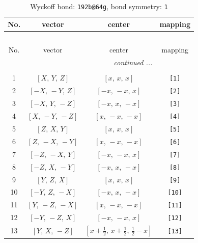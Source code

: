 \documentclass[fleqn,8pt]{jsarticle}
\begin{document}
\begin{longtable}{cccc}
\caption{Wyckoff bond: {\tt 192b@64g}, bond symmetry: {\tt 1}}
 \\
 \hline \hline
No. & vector & center & mapping \\ \hline \endfirsthead

\multicolumn{3}{l}{\tablename\ \thetable{}} \\
 \hline \hline
No. & vector & center & mapping \\ \hline \endhead

 \hline \hline
\multicolumn{3}{r}{\footnotesize\it continued ...} \\ \endfoot

 \hline \hline
\multicolumn{3}{r}{} \\ \endlastfoot

1 & $\left[ X,\, Y,\, Z \right]$ & $\left[ x,\, x,\, x \right]$ & {\tt [1]} \\ \hline
2 & $\left[ - X,\, - Y,\, Z \right]$ & $\left[ - x,\, - x,\, x \right]$ & {\tt [2]} \\ \hline
3 & $\left[ - X,\, Y,\, - Z \right]$ & $\left[ - x,\, x,\, - x \right]$ & {\tt [3]} \\ \hline
4 & $\left[ X,\, - Y,\, - Z \right]$ & $\left[ x,\, - x,\, - x \right]$ & {\tt [4]} \\ \hline
5 & $\left[ Z,\, X,\, Y \right]$ & $\left[ x,\, x,\, x \right]$ & {\tt [5]} \\ \hline
6 & $\left[ Z,\, - X,\, - Y \right]$ & $\left[ x,\, - x,\, - x \right]$ & {\tt [6]} \\ \hline
7 & $\left[ - Z,\, - X,\, Y \right]$ & $\left[ - x,\, - x,\, x \right]$ & {\tt [7]} \\ \hline
8 & $\left[ - Z,\, X,\, - Y \right]$ & $\left[ - x,\, x,\, - x \right]$ & {\tt [8]} \\ \hline
9 & $\left[ Y,\, Z,\, X \right]$ & $\left[ x,\, x,\, x \right]$ & {\tt [9]} \\ \hline
10 & $\left[ - Y,\, Z,\, - X \right]$ & $\left[ - x,\, x,\, - x \right]$ & {\tt [10]} \\ \hline
11 & $\left[ Y,\, - Z,\, - X \right]$ & $\left[ x,\, - x,\, - x \right]$ & {\tt [11]} \\ \hline
12 & $\left[ - Y,\, - Z,\, X \right]$ & $\left[ - x,\, - x,\, x \right]$ & {\tt [12]} \\ \hline
13 & $\left[ Y,\, X,\, - Z \right]$ & $\left[ x + \frac{1}{2},\, x + \frac{1}{2},\, \frac{1}{2} - x \right]$ & {\tt [13]} \\ \hline

\end{longtable}
\end{document}
